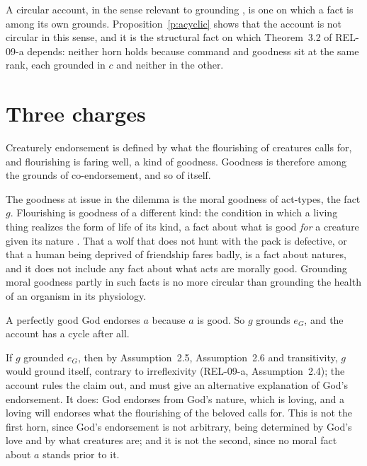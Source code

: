 \documentclass{situationist-preprint}
\begin{document}
A circular account, in the sense relevant to grounding \citep{Fine2012}, is one on which a fact is among its own grounds. Proposition~\ref{p:acyclic} shows that the account is not circular in this sense, and it is the structural fact on which Theorem~3.2 of REL-09-a depends: neither horn holds because command and goodness sit at the same rank, each grounded in $c$ and neither in the other.

\section{Three charges}

\begin{objection}
Creaturely endorsement is defined by what the flourishing of creatures calls for, and flourishing is faring well, a kind of goodness. Goodness is therefore among the grounds of co-endorsement, and so of itself.
\end{objection}

\begin{reply}
The goodness at issue in the dilemma is the moral goodness of act-types, the fact $g$. Flourishing is goodness of a different kind: the condition in which a living thing realizes the form of life of its kind, a fact about what is good \emph{for} a creature given its nature \citep{Foot2001,Thompson2008}. That a wolf that does not hunt with the pack is defective, or that a human being deprived of friendship fares badly, is a fact about natures, and it does not include any fact about what acts are morally good. Grounding moral goodness partly in such facts is no more circular than grounding the health of an organism in its physiology.
\end{reply}

\begin{objection}
A perfectly good God endorses $a$ because $a$ is good. So $g$ grounds $e_G$, and the account has a cycle after all.
\end{objection}

\begin{reply}
If $g$ grounded $e_G$, then by Assumption~2.5, Assumption~2.6 and transitivity, $g$ would ground itself, contrary to irreflexivity (REL-09-a, Assumption~2.4); the account rules the claim out, and must give an alternative explanation of God's endorsement. It does: God endorses from God's nature, which is loving, and a loving will endorses what the flourishing of the beloved calls for. This is not the first horn, since God's endorsement is not arbitrary, being determined by God's love and by what creatures are; and it is not the second, since no moral fact about $a$ stands prior to it.
\end{reply}
\end{document}
